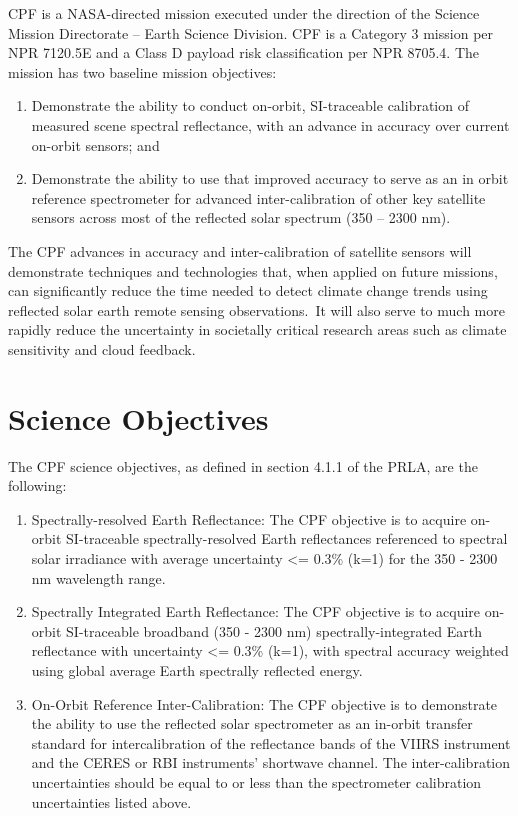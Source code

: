 \gls{CPF} is a NASA-directed mission executed under the direction of the Science Mission Directorate – Earth Science Division. \gls{CPF} is a Category 3 mission per NPR 7120.5E and a Class D payload risk classification per NPR 8705.4. The mission has two baseline mission objectives:

\begin{enumerate}
\item{} Demonstrate the ability to conduct on-orbit, \gls{SI}-traceable calibration of \gls{measure}d scene spectral reflectance, with an advance in accuracy over current on-orbit sensors; and

\item{} Demonstrate the ability to use that improved accuracy to serve as an in orbit reference spectrometer for advanced inter-calibration of other key satellite sensors across most of the reflected solar spectrum (350 – 2300 nm).

\end{enumerate}

The \gls{CPF} advances in accuracy and inter-calibration of satellite sensors will demonstrate techniques and technologies that, when applied on future missions, can significantly reduce the time needed to detect climate change trends using reflected solar earth remote sensing observations. It will also serve to much more rapidly reduce the uncertainty in societally critical research areas such as climate sensitivity and cloud feedback.

\section{Science Objectives }
\label{scienceobjectives}

The \gls{CPF} science objectives, as defined in section 4.1.1 of the PRLA, are the following:

\begin{enumerate}
\item{} Spectrally-resolved Earth Reflectance: The \gls{CPF} objective is to acquire on-orbit \gls{SI}-traceable spectrally-resolved Earth reflectances referenced to spectral solar irradiance with average uncertainty <= 0.3\% (k=1) for the 350 - 2300 nm wavelength range.

\item{} Spectrally Integrated Earth Reflectance: The \gls{CPF} objective is to acquire on-orbit \gls{SI}-traceable broadband (350 - 2300 nm) spectrally-integrated Earth reflectance with uncertainty <= 0.3\% (k=1), with spectral accuracy weighted using global average Earth spectrally reflected energy.

\item{} On-Orbit Reference Inter-Calibration: The \gls{CPF} objective is to demonstrate the ability to use the reflected solar spectrometer as an in-orbit transfer standard for intercalibration of the reflectance bands of the \gls{VIIRS} instrument and the \gls{CERES} or \gls{RBI} instruments' shortwave channel. The inter-calibration uncertainties should be equal to or less than the spectrometer calibration uncertainties listed above.

\end{enumerate}

